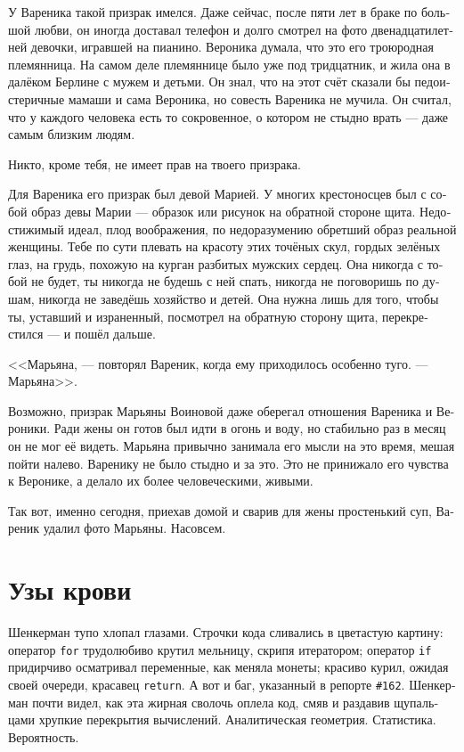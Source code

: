 \documentclass[a5paper,12pt,fleqn]{extbook}\usepackage{cooltooltips}\usepackage{polyglossia}\setdefaultlanguage[babelshorthands=true]{russian}\setotherlanguage{english}\defaultfontfeatures{Ligatures=TeX,Mapping=tex-text} \usepackage{xcolor}\definecolor{lightgray}{HTML}{bbbbbb}\color{lightgray}\newcommand{\ml}[3]{\textenglish{\textcolor{black}{#3}}}
\newcommand{\textspace}{\vspace{1em}{\centering\Large\bfseries<...>\par}\vspace{1em}}
\begin{document}
У Вареника такой призрак имелся.
Даже сейчас, после пяти лет в браке по большой любви, он иногда доставал телефон и долго смотрел на фото двенадцатилетней девочки, игравшей на пианино.
Вероника думала, что это его троюродная племянница.
На самом деле племяннице было уже под тридцатник, и жила она в далёком Берлине с мужем и детьми.
Он знал, что на этот счёт сказали бы педоистеричные мамаши и сама Вероника, но совесть Вареника не мучила.
Он считал, что у каждого человека есть то сокровенное, о котором не стыдно врать --- даже самым близким людям.

Никто, кроме тебя, не имеет прав на твоего призрака.

Для Вареника его призрак был девой Марией.
У многих крестоносцев был с собой образ девы Марии --- образок или рисунок на обратной стороне щита.
Недостижимый идеал, плод воображения, по недоразумению обретший образ реальной женщины.
Тебе по сути плевать на красоту этих точёных скул, гордых зелёных глаз, на грудь, похожую на курган разбитых мужских сердец.
Она никогда с тобой не будет, ты никогда не будешь с ней спать, никогда не поговоришь по душам, никогда не заведёшь хозяйство и детей.
Она нужна лишь для того, чтобы ты, уставший и израненный, посмотрел на обратную сторону щита, перекрестился --- и пошёл дальше.

<<Марьяна, --- повторял Вареник, когда ему приходилось особенно туго.
--- Марьяна>>.

Возможно, призрак Марьяны Воиновой даже оберегал отношения Вареника и Вероники.
Ради жены он готов был идти в огонь и воду, но стабильно раз в месяц он не мог её видеть.
Марьяна привычно занимала его мысли на это время, мешая пойти налево.
Варенику не было стыдно и за это.
Это не принижало его чувства к Веронике, а делало их более человеческими, живыми.

Так вот, именно сегодня, приехав домой и сварив для жены простенький суп, Вареник удалил фото Марьяны.
Насовсем.

\chapter{Узы крови}

\textspace

Шенкерман тупо хлопал глазами.
Строчки кода сливались в цветастую картину: оператор \texttt{\small{for}} трудолюбиво крутил мельницу, скрипя итератором;
оператор \texttt{\small{if}} придирчиво осматривал переменные, как меняла монеты;
красиво курил, ожидая своей очереди, красавец \texttt{\small{return}}.
А вот и баг, указанный в репорте \texttt{\small{\#162}}.
Шенкерман почти видел, как эта жирная сволочь оплела код, смяв и раздавив щупальцами хрупкие перекрытия вычислений.
Аналитическая геометрия.
Статистика.
Вероятность.
\end{document}

